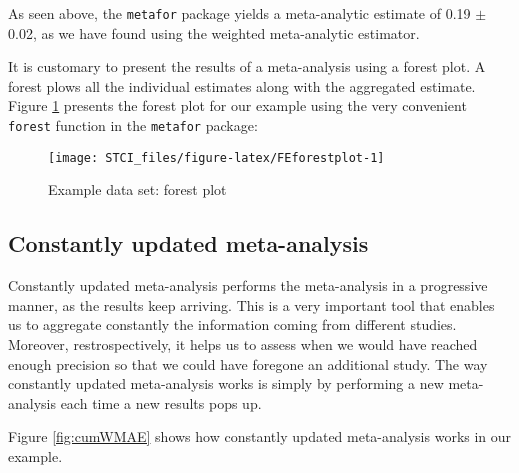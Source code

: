 \documentclass[]{book}
\newenvironment{Shaded}{\begin{snugshade}}{\end{snugshade}}
\newcommand{\KeywordTok}[1]{\textcolor[rgb]{0.13,0.29,0.53}{\textbf{#1}}}
\newcommand{\DataTypeTok}[1]{\textcolor[rgb]{0.13,0.29,0.53}{#1}}
\newcommand{\StringTok}[1]{\textcolor[rgb]{0.31,0.60,0.02}{#1}}
\newcommand{\OperatorTok}[1]{\textcolor[rgb]{0.81,0.36,0.00}{\textbf{#1}}}
\newcommand{\NormalTok}[1]{#1}
\theoremstyle{definition}
\theoremstyle{definition}
\theoremstyle{definition}
\theoremstyle{remark}
\let\BeginKnitrBlock\begin \let\EndKnitrBlock\end
\begin{document}
As seen above, the \texttt{metafor} package yields a meta-analytic
estimate of 0.19 \(\pm\) 0.02, as we have found using the weighted
meta-analytic estimator.

It is customary to present the results of a meta-analysis using a forest
plot. A forest plows all the individual estimates along with the
aggregated estimate. Figure \ref{fig:FEforestplot} presents the forest
plot for our example using the very convenient \texttt{forest} function
in the \texttt{metafor} package:

\begin{Shaded}
\end{Shaded}

\begin{figure}[htbp]

{\centering \texttt{[image: STCI\_files/figure-latex/FEforestplot-1]} 

}

\caption{Example data set: forest plot}\label{fig:FEforestplot}
\end{figure}

\subsection{Constantly updated
meta-analysis}\label{constantly-updated-meta-analysis}

Constantly updated meta-analysis performs the meta-analysis in a
progressive manner, as the results keep arriving. This is a very
important tool that enables us to aggregate constantly the information
coming from different studies. Moreover, restrospectively, it helps us
to assess when we would have reached enough precision so that we could
have foregone an additional study. The way constantly updated
meta-analysis works is simply by performing a new meta-analysis each
time a new results pops up.

\BeginKnitrBlock{example}
\protect\hypertarget{exm:unnamed-chunk-146}{}{\label{exm:unnamed-chunk-146}
}Figure \ref{fig:cumWMAE} shows how constantly updated meta-analysis
works in our example.
\EndKnitrBlock{example}
\end{document}
